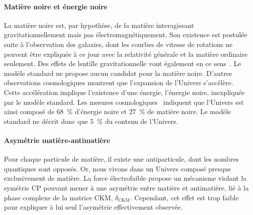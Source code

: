 \paragraph{Matière noire et énergie noire}
La matière noire est, par hypothèse, de la matière interagissant gravitationnellement mais pas électromagnétiquement.
Son existence est postulée suite à l'observation des galaxies, dont les courbes de vitesse de rotations ne peuvent être expliquée à ce jour avec la relativité générale et la matière ordinaire seulement. Des effets de lentille gravitationnelle vont également en ce sens~\cite{Clowe_2006}.
Le modèle standard ne propose aucun candidat pour la matière noire.
D'autres observations cosmologiques montrent que l'expansion de l'Univers s'accélère. Cette accélération implique l'existence d'une énergie, l'énergie noire, inexpliquée par le modèle standard.
Les mesures cosmologiques~\cite{planck_2013} indiquent que l'Univers est ainsi composé de \SI{68}{\%} d'énergie noire et \SI{27}{\%} de matière noire. Le modèle standard ne décrit donc que \SI{5}{\%} du contenu de l'Univers.
\paragraph{Asymétrie matière-antimatière}
Pour chaque particule de matière, il existe une antiparticule, dont les nombres quantiques sont opposés.
Or, nous vivons dans un Univers composé presque exclusivement de matière.
La force électrofaible propose un mécanisme violant la symétrie CP pouvant mener à une asymétrie entre matière et antimatière, lié à la phase complexe de la matrice CKM, $\delta_{\text{CKM}}$.
Cependant, cet effet est trop faible pour expliquer à lui seul l'asymétrie effectivement observée.